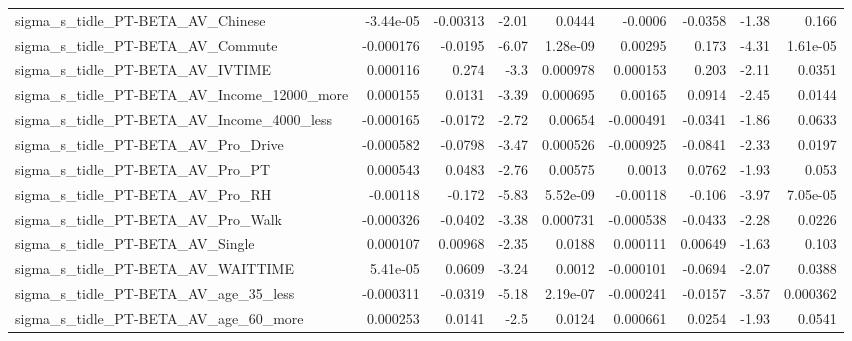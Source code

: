 \begin{tabular}{lrrrrrrrr}
sigma\_s\_tidle\_PT-BETA\_AV\_Chinese                   &   -3.44e-05 &     -0.00313 &     -2.01 &   0.0444 &    -0.0006 &     -0.0358 &        -1.38 &         0.166 \\
sigma\_s\_tidle\_PT-BETA\_AV\_Commute                   &   -0.000176 &      -0.0195 &     -6.07 & 1.28e-09 &    0.00295 &       0.173 &        -4.31 &      1.61e-05 \\
sigma\_s\_tidle\_PT-BETA\_AV\_IVTIME                    &    0.000116 &        0.274 &      -3.3 & 0.000978 &   0.000153 &       0.203 &        -2.11 &        0.0351 \\
sigma\_s\_tidle\_PT-BETA\_AV\_Income\_12000\_more         &    0.000155 &       0.0131 &     -3.39 & 0.000695 &    0.00165 &      0.0914 &        -2.45 &        0.0144 \\
sigma\_s\_tidle\_PT-BETA\_AV\_Income\_4000\_less          &   -0.000165 &      -0.0172 &     -2.72 &  0.00654 &  -0.000491 &     -0.0341 &        -1.86 &        0.0633 \\
sigma\_s\_tidle\_PT-BETA\_AV\_Pro\_Drive                 &   -0.000582 &      -0.0798 &     -3.47 & 0.000526 &  -0.000925 &     -0.0841 &        -2.33 &        0.0197 \\
sigma\_s\_tidle\_PT-BETA\_AV\_Pro\_PT                    &    0.000543 &       0.0483 &     -2.76 &  0.00575 &     0.0013 &      0.0762 &        -1.93 &         0.053 \\
sigma\_s\_tidle\_PT-BETA\_AV\_Pro\_RH                    &    -0.00118 &       -0.172 &     -5.83 & 5.52e-09 &   -0.00118 &      -0.106 &        -3.97 &      7.05e-05 \\
sigma\_s\_tidle\_PT-BETA\_AV\_Pro\_Walk                  &   -0.000326 &      -0.0402 &     -3.38 & 0.000731 &  -0.000538 &     -0.0433 &        -2.28 &        0.0226 \\
sigma\_s\_tidle\_PT-BETA\_AV\_Single                    &    0.000107 &      0.00968 &     -2.35 &   0.0188 &   0.000111 &     0.00649 &        -1.63 &         0.103 \\
sigma\_s\_tidle\_PT-BETA\_AV\_WAITTIME                  &    5.41e-05 &       0.0609 &     -3.24 &   0.0012 &  -0.000101 &     -0.0694 &        -2.07 &        0.0388 \\
sigma\_s\_tidle\_PT-BETA\_AV\_age\_35\_less               &   -0.000311 &      -0.0319 &     -5.18 & 2.19e-07 &  -0.000241 &     -0.0157 &        -3.57 &      0.000362 \\
sigma\_s\_tidle\_PT-BETA\_AV\_age\_60\_more               &    0.000253 &       0.0141 &      -2.5 &   0.0124 &   0.000661 &      0.0254 &        -1.93 &        0.0541 \\

\end{tabular}
